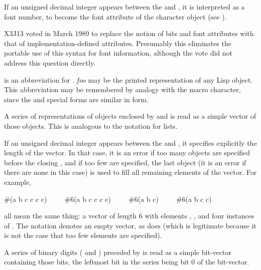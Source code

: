 \begin{flushdesc}
\begin{obsolete}
If an unsigned decimal integer appears between the \cd{\#} and \cd{{\Xbackslash}},
it is interpreted as a font number, to become the font attribute
of the character object (see ).
\end{obsolete}

\begin{newer}
X3J13 voted in March 1989 
to replace the notion of bits and font attributes with
that of implementation-defined attributes.  Presumably
this eliminates the portable use of this syntax for font information,
although the vote did not address this question directly.
\end{newer}

\item[\cd{\#'}]
 is an abbreviation for .
{\it foo} may be the printed representation of any Lisp object.
This abbreviation may be remembered by analogy with the 
macro character, since the  and  special forms are
similar in form.

\item[\cd{\#(}]
A series of representations of objects enclosed by \cd{\#(} and \cd{)}
is read as a simple vector of those objects.  This is analogous to
the notation for lists.

If an unsigned decimal integer appears between the \cd{\#} and \cd{(},
it specifies explicitly the length of the vector.  In that case,
it is an error if too many objects are specified before the closing \cd{)},
and if too few are specified, the last object
(it is an error if there are none in this case)
is used to fill all
remaining elements of the vector.
For example,
\begin{lisp}
\#(a b c c c c)~~~~~\#6(a b c c c c)~~~~~\#6(a b c)~~~~~\#6(a b c c)
\end{lisp}
all mean the same thing: a vector of length 6 with elements , ,
and four instances of .  
The notation \cd{\#()} denotes an empty vector, as does 
(which is legitimate because it is not the case that too few elements
are specified).

\item[\cd{\#*}]
A series of binary digits ( and ) preceded by \cd{\#*} is
read as a simple bit-vector containing those bits, the leftmost bit
in the series being bit 0 of the bit-vector.


\end{flushdesc}
